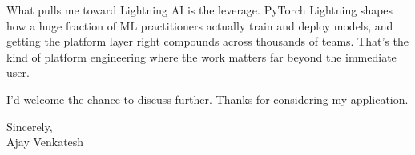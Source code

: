 \documentclass[letterpaper,11pt]{article}
\begin{document}
What pulls me toward Lightning AI is the leverage. PyTorch Lightning shapes how a huge fraction of ML practitioners actually train and deploy models, and getting the platform layer right compounds across thousands of teams. That's the kind of platform engineering where the work matters far beyond the immediate user.

I'd welcome the chance to discuss further. Thanks for considering my application.

\vspace{12pt}
Sincerely, \\
Ajay Venkatesh
\end{document}
